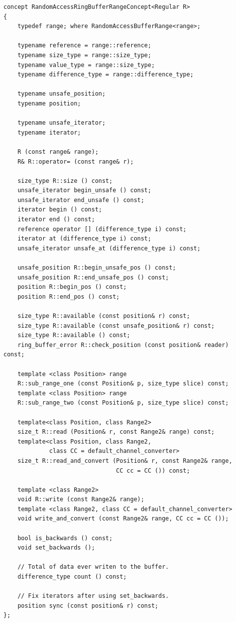 \begin{lstlisting}
concept RandomAccessRingBufferRangeConcept<Regular R> 
{
    typedef range; where RandomAccessBufferRange<range>;

    typename reference = range::reference;
    typename size_type = range::size_type;
    typename value_type = range::size_type;
    typename difference_type = range::difference_type;
    
    typename unsafe_position;
    typename position;

    typename unsafe_iterator;
    typename iterator;
    
    R (const range& range);
    R& R::operator= (const range& r);

    size_type R::size () const;
    unsafe_iterator begin_unsafe () const;
    unsafe_iterator end_unsafe () const;
    iterator begin () const;
    iterator end () const;
    reference operator [] (difference_type i) const;    
    iterator at (difference_type i) const;
    unsafe_iterator unsafe_at (difference_type i) const;
    
    unsafe_position R::begin_unsafe_pos () const;
    unsafe_position R::end_unsafe_pos () const;
    position R::begin_pos () const;
    position R::end_pos () const;
    
    size_type R::available (const position& r) const;
    size_type R::available (const unsafe_position& r) const;    
    size_type R::available () const;
    ring_buffer_error R::check_position (const position& reader) const;

    template <class Position> range
    R::sub_range_one (const Position& p, size_type slice) const;
    template <class Position> range
    R::sub_range_two (const Position& p, size_type slice) const;
    
    template<class Position, class Range2>
    size_t R::read (Position& r, const Range2& range) const;
    template<class Position, class Range2, 
             class CC = default_channel_converter>
    size_t R::read_and_convert (Position& r, const Range2& range, 
                                CC cc = CC ()) const;
   
    template <class Range2>
    void R::write (const Range2& range);
    template <class Range2, class CC = default_channel_converter>
    void write_and_convert (const Range2& range, CC cc = CC ());

    bool is_backwards () const;
    void set_backwards ();
    
    // Total of data ever writen to the buffer.
    difference_type count () const;

    // Fix iterators after using set_backwards.
    position sync (const position& r) const;
};
\end{lstlisting}

